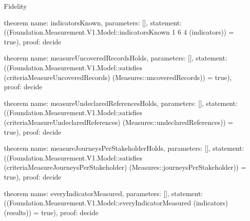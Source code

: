 \begin{lexlean}{Fidelity}
\begin{semanticmodule}
theorem{
  name: indicatorsKnown,
  parameters: [],
  statement: ((Foundation.Measurement.V1.Model::indicatorsKnown 1 6 4 (indicators)) = true),
  proof: decide{}
}

theorem{
  name: measureUncoveredRecordsHolds,
  parameters: [],
  statement: ((Foundation.Measurement.V1.Model::satisfies (criteriaMeasureUncoveredRecords) (Measures::uncoveredRecords)) = true),
  proof: decide{}
}

theorem{
  name: measureUndeclaredReferencesHolds,
  parameters: [],
  statement: ((Foundation.Measurement.V1.Model::satisfies (criteriaMeasureUndeclaredReferences) (Measures::undeclaredReferences)) = true),
  proof: decide{}
}

theorem{
  name: measureJourneysPerStakeholderHolds,
  parameters: [],
  statement: ((Foundation.Measurement.V1.Model::satisfies (criteriaMeasureJourneysPerStakeholder) (Measures::journeysPerStakeholder)) = true),
  proof: decide{}
}

theorem{
  name: everyIndicatorMeasured,
  parameters: [],
  statement: ((Foundation.Measurement.V1.Model::everyIndicatorMeasured (indicators) (results)) = true),
  proof: decide{}
}
\end{semanticmodule}
\end{lexlean}

